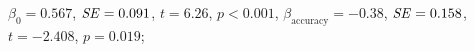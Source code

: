 $\beta_0=0.567$, $\mathit{SE}=0.091$, $t=6.26$, $p<0.001$, $\beta_{\textrm{accuracy}} =-0.38$, $\mathit{SE}=0.158$, $t=-2.408$, $p=0.019$;